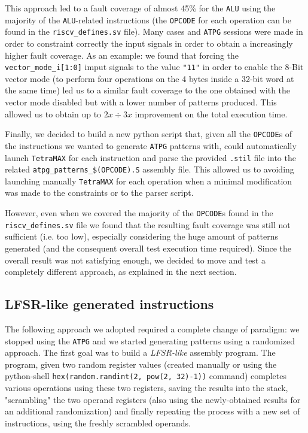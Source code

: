 \documentclass{article}
\begin{document}
This approach led to a fault coverage of almost 45\% for the \texttt{ALU} using the majority of the \texttt{ALU}-related instructions (the \texttt{OPCODE} for each operation can be found in the \texttt{riscv\_defines.sv} file).
Many cases and \texttt{ATPG} sessions were made in order to constraint correctly the input signals in order to obtain a increasingly higher fault coverage. As an example: we found that forcing the \texttt{vector\_mode\_i[1:0]} imput signals to the value \texttt{"11"} in order to enable the 8-Bit vector mode (to perform four operations on the 4 bytes inside a 32-bit word at the same time) led us to a similar fault coverage to the one obtained with the vector mode disabled but with a lower number of patterns produced. This allowed us to obtain up to $2x \div 3x$ improvement on the total execution time.

Finally, we decided to build a new python script that, given all the \texttt{OPCODE}s of the instructions we wanted to generate \texttt{ATPG} patterns with, could automatically launch \texttt{TetraMAX} for each instruction and parse the provided \texttt{.stil} file into the related \texttt{atpg\_patterns\_\$(OPCODE).S} assembly file. This allowed us to avoiding launching manually \texttt{TetraMAX} for each operation when a minimal modification was made to the constraints or to the parser script.

However, even when we covered the majority of the \texttt{OPCODE}s found in the \texttt{riscv\_defines.sv} file we found that the resulting fault coverage was still not sufficient (i.e. too low), especially considering the huge amount of patterns generated (and the consequent overall test execution time required). Since the overall result was not satisfying enough, we decided to move and test a completely different approach, as explained in the next section.

\subsection{LFSR-like generated instructions}
The following approach we adopted required a complete change of paradigm: we stopped using the \texttt{ATPG} and we started generating patterns using a randomized approach. The first goal was to build a \emph{LFSR-like} assembly program. The program, given two random register values (created manually or using the python-shell \texttt{hex(random.randint(2, pow(2, 32)-1))} command) completes various operations using these two registers, saving the results into the stack, "scrambling" the two operand registers (also using the newly-obtained results for an additional randomization) and finally repeating the process with a new set of instructions, using the freshly scrambled operands.
\end{document}
